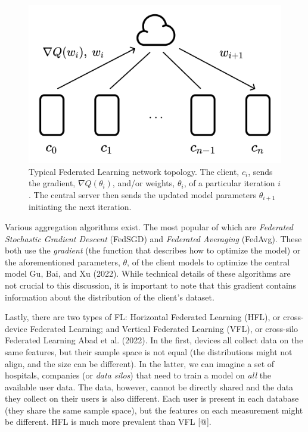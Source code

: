 \begin{figure}
\centering
\includegraphics{images/client-server-fl.png}
\caption{Typical Federated Learning network topology. The client,
\(c_i\), sends the gradient, \(\nabla Q(\theta_i)\), and/or weights,
\(\theta_i\), of a particular iteration \(i\). The central server then
sends the updated model parameters \(\theta_{i+1}\) initiating the next
iteration.}
\end{figure}

Various aggregation algorithms exist. The most popular of which are
\emph{Federated Stochastic Gradient Descent} (FedSGD) and
\emph{Federated Averaging} (FedAvg). These both use the \emph{gradient}
(the function that describes how to optimize the model) or the
aforementioned parameters, \(\theta\), of the client models to optimize
the central model Gu, Bai, and Xu (2022). While technical details of
these algorithms are not crucial to this discussion, it is important to
note that this gradient contains information about the distribution of
the client's dataset.

Lastly, there are two types of FL: Horizontal Federated Learning (HFL),
or cross-device Federated Learning; and Vertical Federated Learning
(VFL), or cross-silo Federated Learning Abad et al. (2022). In the
first, devices all collect data on the same features, but their sample
space is not equal (the distributions might not align, and the size can
be different). In the latter, we can imagine a set of hospitals,
companies (or \emph{data silos}) that need to train a model on
\emph{all} the available user data. The data, however, cannot be
directly shared and the data they collect on their users is also
different. Each user is present in each database (they share the same
sample space), but the features on each measurement might be different.
HFL is much more prevalent than VFL {[}@{]}.

